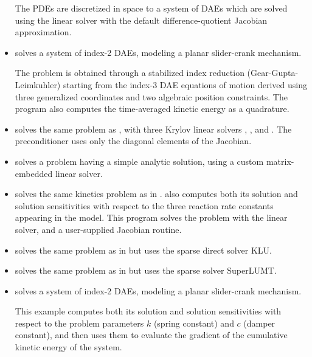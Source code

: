 \begin{itemize}
  The PDEs are discretized in space to a system of DAEs which are solved
  using the {\sunlinsolband} linear solver with the default difference-quotient 
  Jacobian approximation.

\item {}
  solves a system of index-2 DAEs, modeling a planar slider-crank mechanism.

  The problem is obtained through a stabilized index reduction (Gear-Gupta-Leimkuhler)
  starting from the index-3 DAE equations of motion derived using three generalized
  coordinates and two algebraic position constraints.
  The program also computes the time-averaged kinetic energy as a quadrature.

\item {}
  solves the same problem as , with three Krylov linear solvers
  {\sunlinsolspgmr}, {\sunlinsolspbcgs}, and {\sunlinsolsptfqmr}.  The preconditioner uses only
  the diagonal elements of the Jacobian.

\item {} solves a problem having a simple analytic
  solution, using a custom matrix-embedded linear solver.  
  

\item {}
  solves the same kinetics problem as in .
  \newline
  {\idas} also computes both its solution and solution sensitivities with respect
  to the three reaction rate constants appearing in the model. 
  This program solves the problem with the {\sunlinsoldense} linear solver, and a 
  user-supplied Jacobian routine.

\item {}
  solves the same problem as in  but uses
  the sparse direct solver KLU.

\item {}
  solves the same problem as in  but uses
  the sparse solver SuperLUMT.

\item {}
  solves a system of index-2 DAEs, modeling a planar slider-crank mechanism.

  This example computes both its solution and solution sensitivities with respect
  to the problem parameters $k$ (spring constant) and $c$ (damper constant), 
  and then uses them to evaluate the gradient of the cumulative kinetic energy
  of the system.


\end{itemize}

